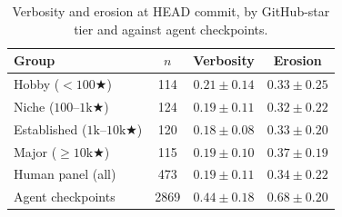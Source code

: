 \begin{table}[H]
    \centering
    \caption{Verbosity and erosion at HEAD commit, by GitHub-star tier and against agent checkpoints.}
    \label{tab:agent-vs-human}
    \footnotesize
    \setlength{\tabcolsep}{6pt}
    \begin{tabular}{lccc}
        \toprule
        Group & $n$ & Verbosity & Erosion \\
        \midrule
        Hobby ($< 100\bigstar$) & 114 & $0.21 \pm 0.14$ & $0.33 \pm 0.25$ \\
        Niche ($100\text{--}1\text{k}\bigstar$) & 124 & $0.19 \pm 0.11$ & $0.32 \pm 0.22$ \\
        Established ($1\text{k}\text{--}10\text{k}\bigstar$) & 120 & $0.18 \pm 0.08$ & $0.33 \pm 0.20$ \\
        Major ($\geq 10\text{k}\bigstar$) & 115 & $0.19 \pm 0.10$ & $0.37 \pm 0.19$ \\
        \midrule
        Human panel (all) & 473 & $0.19 \pm 0.11$ & $0.34 \pm 0.22$ \\
        Agent checkpoints & 2869 & $0.44 \pm 0.18$ & $0.68 \pm 0.20$ \\
        \bottomrule
    \end{tabular}
\end{table}
